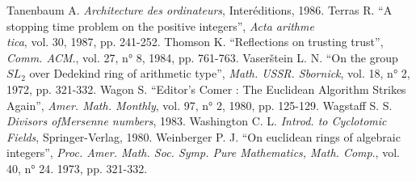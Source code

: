 \documentclass{mai_book}
\begin{document}
{\newline
[168] Tanenbaum A. {\itshape Architecture des ordinateurs}, Inter\'{e}ditions, 1986.
\newline
[169] Terras R. “A stopping time problem on the positive integers”, {\itshape Acta arithme\\tica}, vol. 30, 1987, pp. 241-252.
\newline
[170] Thomson K. “Reflections on trusting trust”, {\itshape Comm. ACM}., vol. 27, n° 8, 1984, pp. 761-763.
\newline
[171] Vaser\v{s}tein L. N. “On the group $SL_{2}$ over Dedekind ring of arithmetic type”, {\itshape Math. USSR. Sbornick}, vol. 18, n° 2, 1972, pp. 321-332.
\newline
[172] Wagon S. “Editor’s Comer : The Euclidean Algorithm Strikes Again”, {\itshape Amer. Math. Monthly}, vol. 97, n° 2, 1980, pp. 125-129.
\newline
[173] Wagstaff S. S. {\itshape Divisors ofMersenne numbers}, 1983.
\newline
[174] Washington C. L. {\itshape Introd. to Cyclotomic Fields}, Springer-Verlag, 1980.
\newline
[175] Weinberger P. J. “On euclidean rings of algebraic integers”, {\itshape Proc. Amer. Math. Soc. Symp. Pure Mathematics, Math. Comp}., vol. 40, n° 24. 1973, pp. 321-332.
\newline
\newline
{}

}
\end{document}
